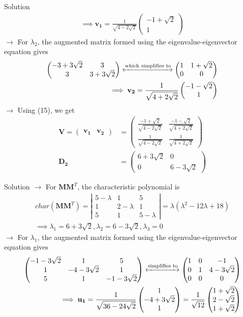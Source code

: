\documentclass{beamer}
\numberwithin{equation}{section}
\theoremstyle{remark}
\newcommand{\myvec}[1]{\ensuremath{\begin{pmatrix}#1\end{pmatrix}}}
\let\vec\mathbf
\begin{document}
\begin{frame}{Solution}
\begin{align}
    \implies \vec{v_1} = \frac{1}{\sqrt{4-2\sqrt{2}}}\myvec{-1+\sqrt{2}\\1}
\end{align}
$\rightarrow$ For $\lambda_2$, the augmented matrix formed using the eigenvalue-eigenvector equation gives
\begin{align}
    \myvec{-3+3\sqrt{2}&3\\3&3+3\sqrt{2}}\xleftrightarrow{\text{which simplifies to}}\myvec{1&1+\sqrt{2}\\0&0} \\
    \implies \vec{v_2} = \frac{1}{\sqrt{4+2\sqrt{2}}}\myvec{-1-\sqrt{2}\\1}
\end{align}
$\rightarrow$ Using (15), we get
\begin{align}
    \vec{V} = \myvec{\vec{v_1}&\vec{v_2}} &= \myvec{\frac{-1+\sqrt{2}}{\sqrt{4-2\sqrt{2}}}&\frac{-1-\sqrt{2}}{\sqrt{4+2\sqrt{2}}} \\ \frac{1}{\sqrt{4-2\sqrt{2}}}&\frac{1}{\sqrt{4+2\sqrt{2}}}} \\
    \vec{D_2} &= \myvec{6+3\sqrt{2}&0\\0&6-3\sqrt{2}}
\end{align}
\end{frame}

\begin{frame}{Solution}
$\rightarrow$ For $\vec{M}\vec{M}^T$, the characteristic polynomial is
\begin{align}
    char(\vec{M}\vec{M}^T) = \left|\begin{array}{ccc}5-\lambda&1&5\\1&2-\lambda&1\\5&1&5-\lambda\end{array}\right| = \lambda(\lambda^2 - 12\lambda + 18) \\
    \implies \lambda_1 = 6 + 3\sqrt{2}, \lambda_2 = 6 - 3\sqrt{2}, \lambda_3 = 0
\end{align}
$\rightarrow$ For $\lambda_1$, the augmented matrix formed using the eigenvalue-eigenvector 
equation gives
\begin{align}
    \myvec{-1-3\sqrt{2}&1&5\\1&-4-3\sqrt{2}&1\\5&1&-1-3\sqrt{2}} \xleftrightarrow{\text{simplifies to}}\myvec{1&0&-1\\0&1&4-3\sqrt{2}\\0&0&0} \\
    \implies \vec{u_1} = \frac{1}{\sqrt{36-24\sqrt{2}}}\myvec{1\\-4+3\sqrt{2}\\1} = \frac{1}{\sqrt{12}}\myvec{1+\sqrt{2}\\2-\sqrt{2}\\1+\sqrt{2}}
\end{align}
\end{frame}
\end{document}
